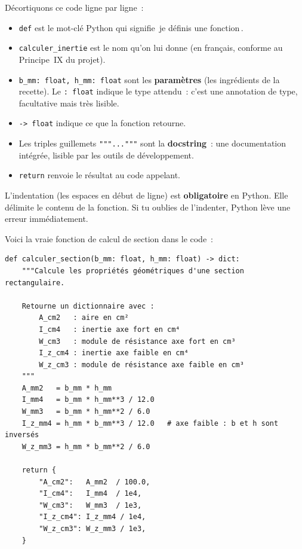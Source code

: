 \documentclass[12pt, a4paper, openany]{book}
\newcommand{\py}[1]{\texttt{#1}}
\newcommand{\fichier}[1]{\texttt{\textit{#1}}}
\begin{document}
D\'ecortiquons ce code ligne par ligne~:

\begin{itemize}
  \item \py{def} est le mot-cl\'e Python qui signifie
        \guillemotleft\,je d\'efinis une fonction\,\guillemotright.
  \item \py{calculer\_inertie} est le nom qu'on lui donne
        (en fran\c{c}ais, conforme au Principe~IX du projet).
  \item \py{b\_mm: float, h\_mm: float} sont les \textbf{param\`etres}
        (les ingr\'edients de la recette). Le \py{: float} indique le type
        attendu~: c'est une annotation de type, facultative mais tr\`es lisible.
  \item \py{-> float} indique ce que la fonction retourne.
  \item Les triples guillemets \py{"""..."""} sont la \textbf{docstring}~:
        une documentation int\'egr\'ee, lisible par les outils de d\'eveloppement.
  \item \py{return} renvoie le r\'esultat au code appelant.
\end{itemize}

\begin{important}
L'indentation (les espaces en d\'ebut de ligne) est \textbf{obligatoire}
en Python. Elle d\'elimite le contenu de la fonction. Si tu oublies de
l'indenter, Python l\`eve une erreur imm\'ediatement.
\end{important}

Voici la vraie fonction de calcul de section dans le code~:

\begin{lstlisting}[style=python, caption={Extrait de \fichier{ec5/proprietes.py} --- calcul des propriétés de section}]
def calculer_section(b_mm: float, h_mm: float) -> dict:
    """Calcule les propriétés géométriques d'une section rectangulaire.

    Retourne un dictionnaire avec :
        A_cm2   : aire en cm²
        I_cm4   : inertie axe fort en cm⁴
        W_cm3   : module de résistance axe fort en cm³
        I_z_cm4 : inertie axe faible en cm⁴
        W_z_cm3 : module de résistance axe faible en cm³
    """
    A_mm2   = b_mm * h_mm
    I_mm4   = b_mm * h_mm**3 / 12.0
    W_mm3   = b_mm * h_mm**2 / 6.0
    I_z_mm4 = h_mm * b_mm**3 / 12.0   # axe faible : b et h sont inversés
    W_z_mm3 = h_mm * b_mm**2 / 6.0

    return {
        "A_cm2":   A_mm2  / 100.0,
        "I_cm4":   I_mm4  / 1e4,
        "W_cm3":   W_mm3  / 1e3,
        "I_z_cm4": I_z_mm4 / 1e4,
        "W_z_cm3": W_z_mm3 / 1e3,
    }
\end{lstlisting}
\end{document}
